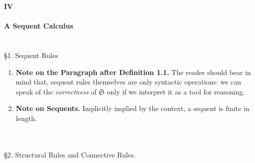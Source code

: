 {\LARGE \bfseries IV \\ \\ A Sequent Calculus}
\\
\\
\\
{\large \S1. Sequent Rules}
\begin{enumerate}[1.]
%
\item \textbf{Note on the Paragraph after Definition 1.1.} The reader should bear in mind that, sequent rules themselves are only syntactic operations: we can speak of the \emph{correctness} of $\mathfrak{S}$ only if we interpret it as a tool for reasoning.
%
\item \textbf{Note on Sequents.} Implicitly implied by the context, a sequent is finite in length.
%
\end{enumerate}
\ 
\\
\\
{\large \S2. Structural Rules and Connective Rules}
